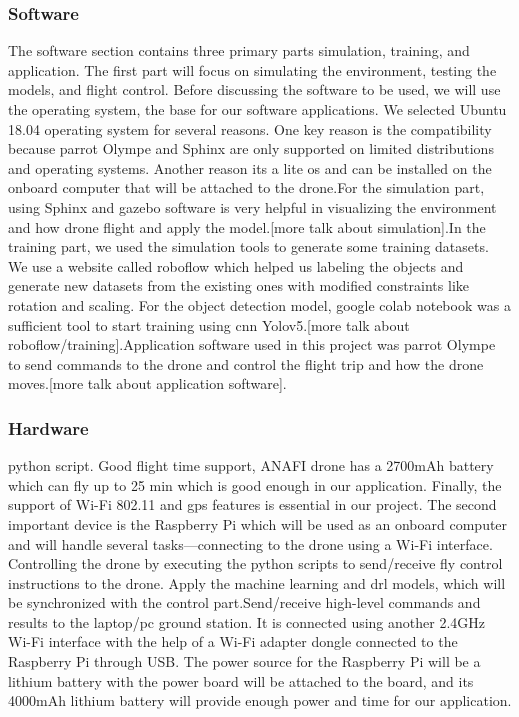 \documentclass[../main.tex]{subfiles}
\begin{document}
\subsubsection{Software}
The software section contains three primary parts simulation, training, and application. The first part will focus on simulating the environment, testing the models, and flight control. Before discussing the software to be used, we will use the operating system, the base for our software applications. We selected Ubuntu 18.04 operating system for several reasons. One key reason is the compatibility because parrot Olympe and Sphinx are only supported on limited distributions and operating systems. Another reason its a lite os and can be installed on the onboard computer that will be attached to the drone.For the simulation part, using Sphinx and gazebo software is very helpful in visualizing the environment and how drone flight and apply the model.[more talk about simulation].In the training part, we used the simulation tools to generate some training datasets. We use a website called roboflow which helped us labeling the objects and generate new datasets from the existing ones with modified constraints like rotation and scaling. For the object detection model, google colab notebook was a sufficient tool to start training using \gls{cnn} Yolov5.[more talk about roboflow/training].Application software used in this project was parrot Olympe to send commands to the drone and control the flight trip and how the drone moves.[more talk about application software].


\subsubsection{Hardware}
python script. Good flight time support, ANAFI drone has a 2700mAh battery which can fly up to 25 min which is good enough in our application. Finally, the support of Wi-Fi 802.11 and \gls{gps} features is essential in our project. The second important device is the Raspberry Pi which will be used as an onboard computer and will handle several tasks—connecting to the drone using a Wi-Fi interface. Controlling the drone by executing the python scripts to send/receive fly control instructions to the drone. Apply the machine learning and \gls{drl} models, which will be synchronized with the control part.Send/receive high-level commands and results to the laptop/pc ground station. It is connected using another 2.4GHz Wi-Fi interface with the help of a Wi-Fi adapter dongle connected to the Raspberry Pi through USB. The power source for the Raspberry Pi will be a lithium battery with the power board will be attached to the board, and its 4000mAh lithium battery will provide enough power and time for our application.      
\end{document}
